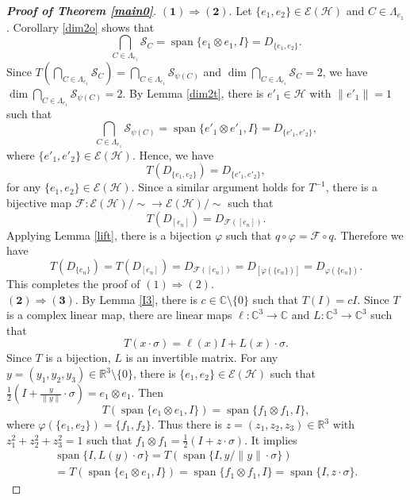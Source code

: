 \documentclass[11pt]{amsart}
\theoremstyle{remark}
\newcommand{\cH}{{\mathcal{H}}}
\newcommand{\SC}{\mathcal{S}_C}
\newcommand{\Span}{\operatorname{span}}
\begin{document}
\begin{proof}[{\textbf {Proof of Theorem \ref{main0}}}] 
$\bm{(1) \Rightarrow (2)}.$ Let $\{e_1,e_2\} \in \mathcal{E}(\cH)$ and  $C \in \Lambda_{e_1}$. Corollary \ref{dim2o} shows that 
\[
\bigcap_{C \in \Lambda_{e_1}} \SC=\Span\{e_1 \otimes e_1, I \}=D_{\{e_1,e_2\}}. 
\]
Since $T(\bigcap_{C \in \Lambda_{e_1}} \SC)=\bigcap_{C \in \Lambda_{e_1}} \mathcal{S}_{\psi(C)}$ and $\dim \bigcap_{C \in \Lambda_{e_1}} \SC=2$, we have $\dim \bigcap_{C \in \Lambda_{e_1}} \mathcal{S}_{\psi(C)}=2$. By Lemma \ref{dim2t},  there is $e'_1 \in \cH$ with $\|e'_1\|=1$ such that 
\[
\bigcap_{C \in \Lambda_{e_1}} \mathcal{S}_{\psi(C)}=\Span\{e'_1 \otimes e'_1, I \}=D_{\{e'_1,e'_2\}},
\]
where $\{e'_1, e'_2\} \in \mathcal{E}(\cH)$. 
Hence, we have 
\begin{equation}\label{diago}
T(D_{\{e_1,e_2\}})=D_{\{e'_1,e'_2\}}, 
\end{equation}
for any $\{e_1,e_2\}  \in \mathcal{E}(\cH)$. Since a similar argument holds for $T^{-1}$, there is a bijective map $\mathcal{F}: \mathcal{E}(\cH)/ \sim \to \mathcal{E}(\cH)/ \sim$ such that 
\[
T(D_{[e_n]})=D_{\mathcal{F}([e_n])}.
\]
Applying Lemma \ref{lift}, there is a bijection $\varphi$ such that $q\circ \varphi=\mathcal{F} \circ q$. Therefore we have
\[
T(D_{\{e_n\}})=T(D_{[e_n]})=D_{\mathcal{F}([e_n])}=D_{[\varphi(\{e_n\})]}=D_{\varphi(\{e_n\})}.
\] 
This completes the proof of  $(1)\Rightarrow(2)$. \\
$\bm{(2) \Rightarrow (3)}.$ 
By Lemma \ref{I3}, there is $c \in \mathbb{C} \setminus \{0\}$ such that $T(I)=cI$. Since $T$ is a complex linear map, there are linear maps $\ell: \mathbb{C}^3 \to \mathbb{C}$ and $L: \mathbb{C}^3 \to \mathbb{C}^3$ such that 
\[
T(x \cdot \sigma)=\ell(x)I+L(x)\cdot \sigma.
\]
Since $T$ is a bijection, $L$ is an invertible matrix. For any $y=(y_1, y_2, y_3) \in \mathbb{R}^3 \setminus \{0\}$, there is $\{e_1, e_2\} \in \mathcal{E}(\cH)$ such that $\frac{1}{2}(I+\frac{y}{\|y\|}\cdot \sigma)=e_1\otimes e_1$. Then %
\[
T(\Span\{e_1\otimes e_1, I\})=\Span\{f_1 \otimes f_1, I\},
\]
where $\varphi(\{e_1, e_2\})=\{f_1, f_2\}$. Thus there is $z=(z_1, z_2, z_3) \in \mathbb{R}^3$ with $z_1^2+z_2^2+z_3^2=1$ such that $f_1 \otimes f_1=\frac{1}{2}(I+z \cdot \sigma)$. 
It implies 
\begin{multline*}
\Span\{I, L(y)\cdot \sigma\}=T(\Span\{I, y/\|y\| \cdot \sigma\})\\=T(\Span\{e_1\otimes e_1, I\})=\Span\{f_1 \otimes f_1, I\}=\Span\{I, z \cdot \sigma\}.

\end{multline*}
\end{proof}
\end{document}
